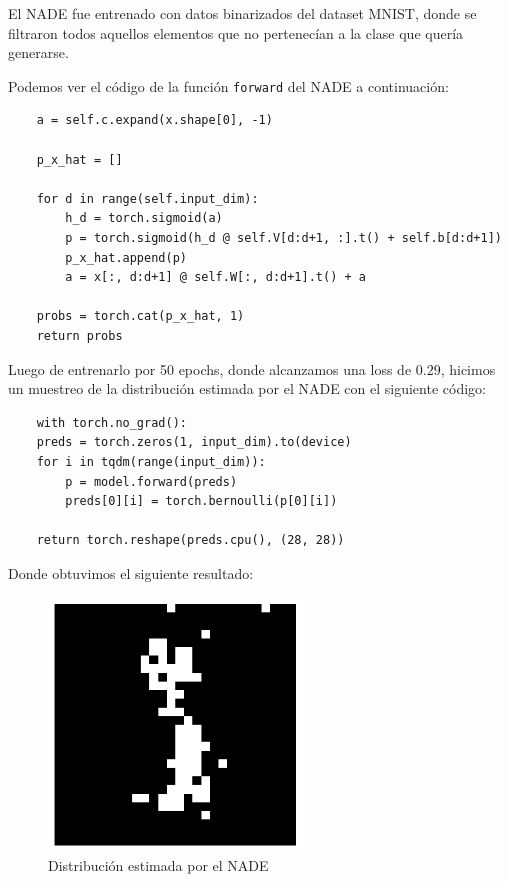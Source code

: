 \documentclass[11pt]{article}
\begin{document}
El NADE fue entrenado con datos binarizados del dataset MNIST, donde se filtraron todos aquellos elementos que no pertenecían a la clase que quería generarse.

Podemos ver el código de la función \texttt{forward} del NADE a continuación:

\begin{verbatim}
    a = self.c.expand(x.shape[0], -1)

    p_x_hat = []

    for d in range(self.input_dim):
        h_d = torch.sigmoid(a)
        p = torch.sigmoid(h_d @ self.V[d:d+1, :].t() + self.b[d:d+1])
        p_x_hat.append(p)
        a = x[:, d:d+1] @ self.W[:, d:d+1].t() + a

    probs = torch.cat(p_x_hat, 1)
    return probs
\end{verbatim}

Luego de entrenarlo por 50 epochs, donde alcanzamos una loss de $0.29$, hicimos un muestreo de la distribución estimada por el NADE con el siguiente código:
\begin{verbatim}
    with torch.no_grad():
    preds = torch.zeros(1, input_dim).to(device)
    for i in tqdm(range(input_dim)):
        p = model.forward(preds)
        preds[0][i] = torch.bernoulli(p[0][i])

    return torch.reshape(preds.cpu(), (28, 28))
\end{verbatim}
\newpage
Donde obtuvimos el siguiente resultado:

\begin{figure}[h]
    \centering
    \includegraphics[width=0.6\textwidth]{NADE/nade_generation.png}
    \caption{Distribución estimada por el NADE}
    \label{fig:nade_gen}
\end{figure}
\end{document}
